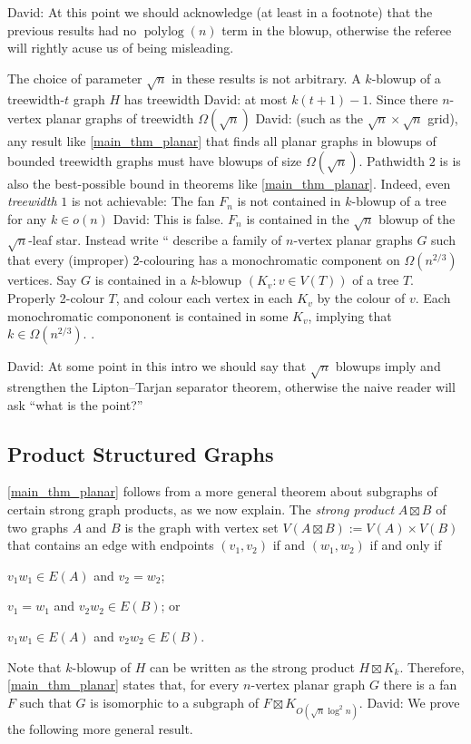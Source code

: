 \documentclass{patmorin}
\newcommand{\david}[1]{{\color{orange} David: #1}}
\newcommand{\defin}[1]{\emph{\textcolor{brightmaroon}{#1}}}
\DeclareMathOperator{\polylog}{polylog}
\begin{document}
\david{At this point we should acknowledge (at least in a footnote) that the previous results had no $\polylog(n)$ term in the blowup, otherwise the referee will rightly acuse us of being misleading. }

The choice of parameter $\sqrt{n}$ in these results is not arbitrary. A $k$-blowup of a treewidth-$t$ graph $H$ has treewidth \david{at most} $k(t+1)-1$.  Since there $n$-vertex planar graphs of treewidth $\Omega(\sqrt{n})$ \david{(such as the $\sqrt{n}\times\sqrt{n}$ grid)}, any result like \cref{main_thm_planar} that finds all planar graphs in blowups of bounded treewidth graphs must have blowups of size $\Omega(\sqrt{n})$.  Pathwidth $2$ is is also the best-possible bound in theorems like  \cref{main_thm_planar}.  Indeed, even \emph{treewidth} $1$ is not achievable:  The fan $F_n$ is not contained in $k$-blowup of a tree for any $k\in o(n)$ \david{This is false. $F_n$ is contained in the $\sqrt{n}$ blowup of the $\sqrt{n}$-leaf star. Instead write ``\citet{LMST08} describe a family of $n$-vertex planar graphs $G$ such that every (improper) 2-colouring has a monochromatic component on $\Omega(n^{2/3})$ vertices. Say $G$ is contained in a $k$-blowup $(K_v:v\in V(T))$ of a tree $T$. Properly 2-colour $T$, and colour each vertex in each $K_v$ by the colour of $v$. Each monochromatic compononent is contained in some $K_v$, implying that $k\in\Omega(n^{2/3})$. }.

\david{At some point in this intro we should say that $\sqrt{n}$ blowups imply and strengthen the Lipton--Tarjan separator theorem, otherwise the naive reader will ask ``what is the point?''}

\subsection{Product Structured Graphs}

\cref{main_thm_planar} follows from a more general theorem about subgraphs of certain strong graph products, as we now explain.  The \defin{strong product} $A\boxtimes B$ of two graphs $A$ and $B$ is the graph with vertex set $V(A\boxtimes B):=V(A)\times V(B)$ that contains an edge with endpoints $(v_1,v_2)$ if and $(w_1,w_2)$ if and only if
\begin{compactenum}
    \item $v_1w_1\in E(A)$ and $v_2=w_2$;
    \item $v_1=w_1$ and $v_2w_2\in E(B)$; or
    \item $v_1w_1\in E(A)$ and $v_2w_2\in E(B)$.
\end{compactenum}
Note that $k$-blowup of $H$ can be written as the strong product $H\boxtimes K_k$.  Therefore, \cref{main_thm_planar} states that, for every $n$-vertex planar graph $G$ there is a fan $F$ such that $G$ is isomorphic to a subgraph of $F\boxtimes K_{O(\sqrt{n}\log^2 n)}$. \david{We prove the following more general result.}
\end{document}
